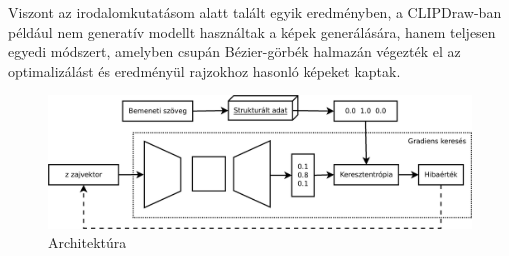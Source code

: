 Viszont az irodalomkutatásom alatt talált egyik eredményben, a CLIPDraw-ban \cite{frans2021clipdraw} például nem generatív modellt használtak a képek generálására, hanem teljesen egyedi módszert, amelyben csupán Bézier-görbék halmazán végezték el az optimalizálást és eredményül rajzokhoz hasonló képeket kaptak.



\begin{figure}[h]
\centering
\includegraphics[width=15cm]{images/architecture.png}
\caption{Architektúra}
\label{fig:architecture}
\end{figure}




